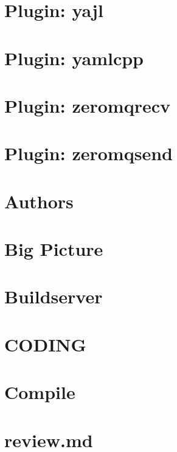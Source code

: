 \let\mypdfximage\pdfximage\def\pdfximage{\immediate\mypdfximage}\documentclass[twoside]{book}
\newcommand{\+}{\discretionary{\mbox{\scriptsize$\hookleftarrow$}}{}{}}
\begin{document}
\chapter{Plugin\+: yajl}
\label{md_src_plugins_yajl_README}

\chapter{Plugin\+: yamlcpp}
\label{md_src_plugins_yamlcpp_README}

\chapter{Plugin\+: zeromqrecv}
\label{md_src_plugins_zeromqrecv_README}

\chapter{Plugin\+: zeromqsend}
\label{md_src_plugins_zeromqsend_README}

\chapter{Authors}
\label{doc_AUTHORS_md}

\chapter{Big Picture}
\label{doc_BIGPICTURE_md}

\chapter{Buildserver}
\label{doc_BUILDSERVER_md}

\chapter{CODING}
\label{doc_CODING_md}

\chapter{Compile}
\label{doc_COMPILE_md}

\chapter{review.\+md}
\label{doc_contrib_api_review_md}

\end{document}
